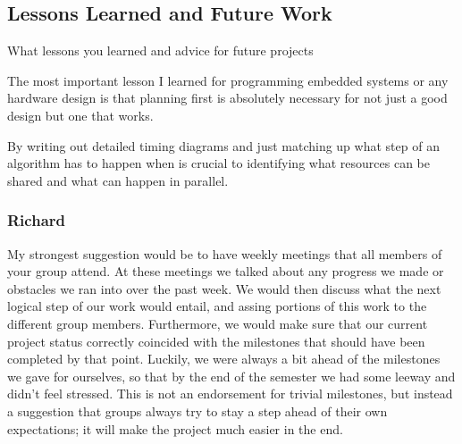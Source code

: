 \subsection{Lessons Learned and Future Work}
What lessons you learned and advice for future projects

The most important lesson I learned for programming embedded systems or any hardware design 
is that planning first is absolutely necessary for not just a good design but one that works. 

By writing out detailed timing diagrams and just matching up what step of an algorithm has to 
happen when is crucial to identifying what resources can be shared and what can happen in 
parallel. 

\subsubsection{Richard}

My strongest suggestion would be to have weekly meetings that all members of your group attend.
At these meetings we talked about any progress we made or obstacles we ran into over
the past week. We would then discuss what the next logical step of our work would entail, and assing
portions of this work to the different group members. Furthermore, we would make sure that our
current project status correctly coincided with the milestones that should have been completed
by that point. Luckily, we were always a bit ahead of the milestones we gave for ourselves,
so that by the end of the semester we had some leeway and didn't feel stressed. This is not
an endorsement for trivial milestones, but instead a suggestion that groups always try to stay
a step ahead of their own expectations; it will make the project much easier in the end.

